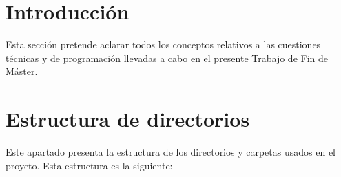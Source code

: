 
\section{Introducción}

Esta sección pretende aclarar todos los conceptos relativos a las cuestiones técnicas y de programación llevadas a cabo en el presente Trabajo de Fin de Máster.

\section{Estructura de directorios}
Este apartado presenta la estructura de los directorios y carpetas usados en el proyeto. Esta estructura es la siguiente:

